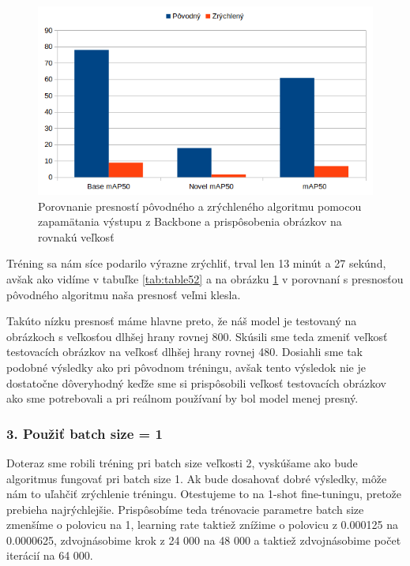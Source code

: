 \begin{figure}[H]
\centering
\includegraphics[width=\textwidth]{images/same_size_compare_graph.png}
\caption{Porovnanie presností pôvodného a zrýchleného algoritmu pomocou zapamätania výstupu z Backbone a prispôsobenia obrázkov na rovnakú veľkosť}
\label{fig:image0}
\end{figure}

Tréning sa nám síce podarilo výrazne zrýchliť, trval len 13 minút a 27 sekúnd, avšak ako vidíme v tabuľke \ref{tab:table52} a na obrázku \ref{fig:image0} v porovnaní s presnosťou pôvodného algoritmu naša presnosť veľmi klesla. 

Takúto nízku presnosť máme hlavne preto, že náš model je testovaný na obrázkoch s veľkosťou dlhšej hrany rovnej 800. Skúsili sme teda zmeniť veľkosť testovacích obrázkov na veľkosť dlhšej hrany rovnej 480. Dosiahli sme tak podobné výsledky ako pri pôvodnom tréningu, avšak tento výsledok nie je dostatočne dôveryhodný keďže sme si prispôsobili veľkosť testovacích obrázkov ako sme potrebovali a pri reálnom používaní by bol model menej presný. 

\subsubsection{3. Použiť batch size = 1}

Doteraz sme robili tréning pri batch size veľkosti 2, vyskúšame ako bude algoritmus fungovať pri batch size 1. Ak bude dosahovať dobré výsledky, môže nám to uľahčiť zrýchlenie tréningu. Otestujeme to na 1-shot fine-tuningu, pretože prebieha najrýchlejšie. Prispôsobíme teda trénovacie parametre batch size zmenšíme o polovicu na 1, learning rate taktiež znížime o polovicu z 0.000125 na 0.0000625, zdvojnásobime krok z 24 000 na 48 000 a taktiež zdvojnásobime počet iterácií na 64 000.

